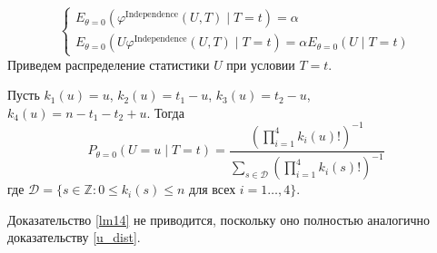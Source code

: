     $$
    \begin{cases}
        E_{\theta=0}(\varphi^{\text{Independence}}(U,T) \mid T=t)=\alpha \\
        E_{\theta=0}(U\varphi^{\text{Independence}}(U,T) \mid T=t)=\alpha E_{\theta=0}(U \mid T=t)
    \end{cases}
    $$
    Приведем распределение статистики $U$ при условии $T=t$.
\begin{lemma}\label{lm14}
    Пусть $k_1(u)=u$, $k_2(u)=t_1-u$, $k_3(u)=t_2-u$,\\
    $k_4(u)=n-t_1-t_2+u$.
        Тогда
        $$P_{\theta=0}(U=u \mid T=t)=\dfrac{(\prod_{i=1}^4 k_i(u)!)^{-1}}
            {\sum_{s\in \mathcal{D}} (\prod_{i=1}^4 k_i(s)!)^{-1}}$$
        где $\mathcal{D}=\{s \in \mathbb{Z}: 0\leq k_i(s) \leq n \text{ для всех } i=1\ldots,4\}$.
\end{lemma}
Доказательство \autoref{lm14} не приводится, поскольку оно полностью 
аналогично доказательству \autoref{u_dist}.


